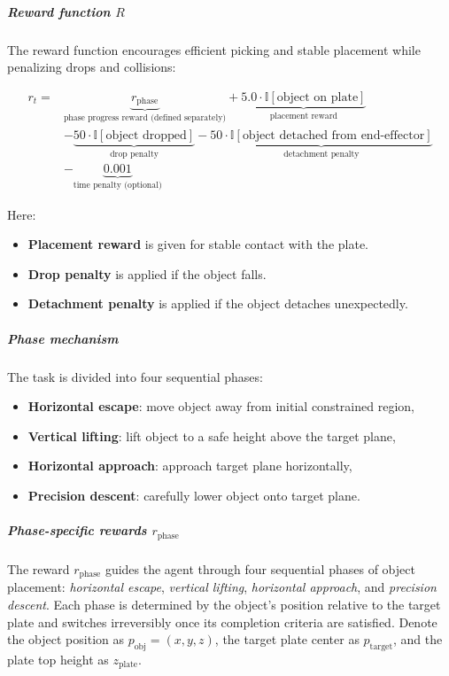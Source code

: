 \documentclass[english, 12pt, a4paper, elec, utf8, a-2b, online]{aaltothesis}
\begin{document}
\subparagraph{Reward function $R$}
The reward function encourages efficient picking and stable placement while penalizing drops and collisions:

\begin{equation}
\begin{aligned}
r_t = & \underbrace{r_\text{phase}}_{\text{phase progress reward (defined separately)}} +
       \underbrace{5.0 \cdot \mathbb{I}[\text{object on plate}]}_{\text{placement reward}} \\
      & - \underbrace{50 \cdot \mathbb{I}[\text{object dropped}]}_{\text{drop penalty}} -
       \underbrace{50 \cdot \mathbb{I}[\text{object detached from end-effector}]}_{\text{detachment penalty}} \\
      & - \underbrace{0.001}_{\text{time penalty (optional)}} 
\end{aligned}
\end{equation}

Here:

\begin{itemize}
    \item \textbf{Placement reward} is given for stable contact with the plate.
    \item \textbf{Drop penalty} is applied if the object falls.
    \item \textbf{Detachment penalty} is applied if the object detaches unexpectedly.
\end{itemize}

\subparagraph{Phase mechanism}
The task is divided into four sequential phases:
\begin{itemize}
    \item \textbf{Horizontal escape}: move object away from initial constrained region,
    \item \textbf{Vertical lifting}: lift object to a safe height above the target plane,
    \item \textbf{Horizontal approach}: approach target plane horizontally,
    \item \textbf{Precision descent}: carefully lower object onto target plane.
\end{itemize}

\subparagraph{Phase-specific rewards $r_\text{phase}$}
The reward $r_\text{phase}$ guides the agent through four sequential phases of object placement: \textit{horizontal escape}, \textit{vertical lifting}, \textit{horizontal approach}, and \textit{precision descent}. Each phase is determined by the object's position relative to the target plate and switches irreversibly once its completion criteria are satisfied. Denote the object position as $p_\text{obj} = (x, y, z)$, the target plate center as $p_\text{target}$, and the plate top height as $z_\text{plate}$.
\end{document}

